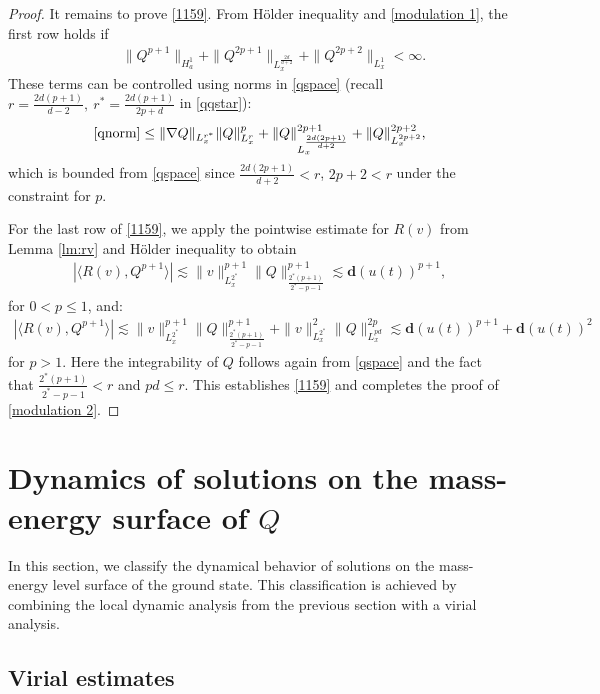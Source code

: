 \documentclass[12pt]{amsart}
\begin{document}
\begin{proof}
It remains to prove \eqref{1159}. From H\"older inequality and \eqref{modulation 1}, the first row holds if  
\begin{align}\label{qnorm}
\qquad\|Q^{p+1}\|_{H^1_a}+\|Q^{2p+1}\|_{L_x^{\frac{2d}{d+2}}}+\|Q^{2p+2}\|_{L_x^1} <\infty.
\end{align}
These terms can be controlled using norms in \eqref{qspace} (recall  $r=\tfrac{2d(p+1)}{d-2},\ r^*=\tfrac{2d(p+1)}{2p+d} $ in \eqref{qqstar}):
\begin{align*}
\eqref{qnorm}\le \|\nabla Q\|_{L_x^{r^*}}\|Q\|_{L_x^r}^p+\|Q\|_{L_x^{\frac{2d(2p+1)}{d+2}}}^{2p+1}+\|Q\|_{L_x^{2p+2}}^{2p+2},
\end{align*}
which is bounded from \eqref{qspace} since $\frac{2d(2p+1)}{d+2}<r$, $2p+2<r$ under the constraint for $p$. 

For the last row of \eqref{1159}, we apply the pointwise estimate for $R(v)$ from Lemma \ref{lm:rv}
and H\"older inequality to obtain 
\begin{align*}
|\langle R(v), Q^{p+1}\rangle|\lesssim \|v\|_{L_x^{2^*}}^{p+1}\|Q\|^{p+1}_{\frac{2^*(p+1)}{2^*-p-1}}\lesssim \textbf{d}(u(t))^{p+1}, 
\end{align*}
for $0<p\le 1$, and:
\begin{align*}
|\langle R(v), Q^{p+1}\rangle|\lesssim \|v\|_{L_x^{2^*}}^{p+1}\|Q\|^{p+1}_{\frac{2^*(p+1)}{2^*-p-1}}+\|v\|_{L_x^{2^*}}^2\|Q\|_{L_x^{pd}}^{2p}\lesssim \textbf{d}(u(t))^{p+1} +\textbf{d}(u(t))^{2} 
\end{align*}
for $p>1$. 
Here the integrability of $Q$ follows again from \eqref{qspace} and the fact that $\frac{2^*(p+1)}{2^*-p-1}<r$ and $pd\le r$. This establishes \eqref{1159} and completes the proof of \eqref{modulation 2}. 
\end{proof}


\section{Dynamics of solutions on the mass-energy surface of $Q$}\label{S:Q}
In this section, we classify the dynamical behavior of solutions on the mass-energy level surface of the ground state. This classification is achieved by combining the local dynamic analysis from the previous section with a virial analysis.  

\subsection{Virial estimates}\label{virial}
\end{document}
